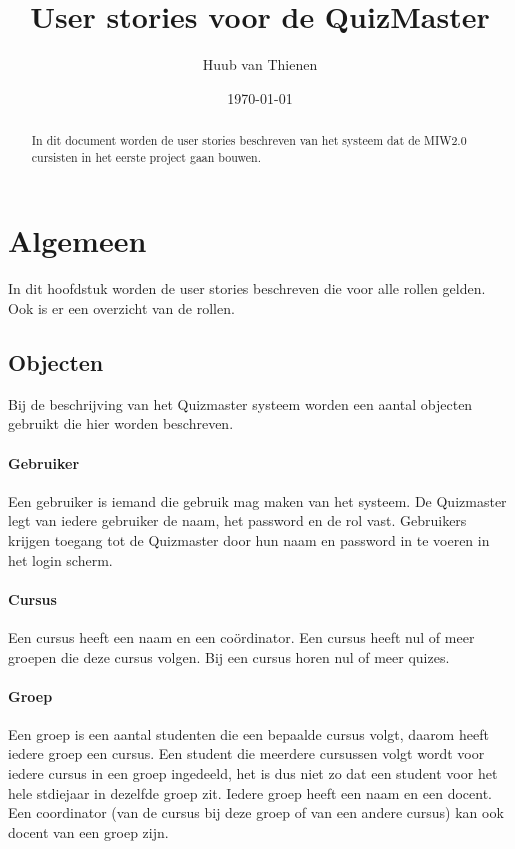 \documentclass[11pt, a4paper]{article}
\begin{document}
\title{User stories voor de QuizMaster}
\date{\today}
\author{Huub van Thienen}
\maketitle
\begin{abstract}
In dit document worden de user stories beschreven van het systeem dat de MIW2.0 cursisten in het eerste project gaan bouwen.
\end{abstract}

\section{Algemeen}

In dit hoofdstuk worden de user stories beschreven die voor alle rollen gelden. Ook is er een overzicht van de rollen.

\subsection{Objecten}
Bij de beschrijving van het Quizmaster systeem worden een aantal objecten gebruikt die hier worden beschreven.

\paragraph{Gebruiker} Een gebruiker is iemand die gebruik mag maken van het systeem. 
De Quizmaster legt van iedere gebruiker de naam, het password en de rol vast. 
Gebruikers krijgen toegang tot de Quizmaster door hun naam en password in te voeren in het login scherm.

\paragraph{Cursus} Een cursus heeft een naam en een co\"ordinator.
Een cursus heeft nul of meer groepen die deze cursus volgen.
Bij een cursus horen nul of meer quizes.

\paragraph{Groep} Een groep is een aantal studenten die een bepaalde cursus volgt, daarom heeft iedere groep een cursus.
Een student die meerdere cursussen volgt wordt voor iedere cursus in een groep ingedeeld, het is dus niet zo dat een student voor het hele stdiejaar in dezelfde groep zit.
Iedere groep heeft een naam en een docent.
Een coordinator (van de cursus bij deze groep of van een andere cursus) kan ook docent van een groep zijn.
\end{document}
